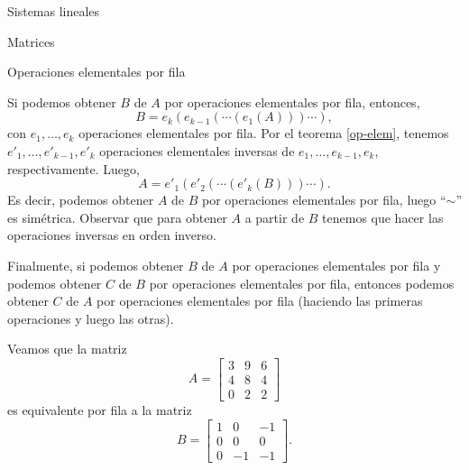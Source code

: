 \begin{chapter}{Sistemas lineales}
\begin{section}{Matrices}
\begin{subsection}{Operaciones elementales por fila}
\begin{observacion*}
                    Si podemos obtener $B$ de $A$ por operaciones elementales por fila, entonces, 
                    $$
                    B = e_k(e_{k-1}(\cdots(e_1(A)))\cdots),
                    $$
                    con $e_1,\ldots,e_k$ operaciones elementales por fila. Por el teorema \ref{op-elem},  tenemos $e'_1,\ldots,e'_{k-1},e'_k$ operaciones elementales inversas de  $e_1,\ldots,e_{k-1},e_k$, respectivamente. Luego, 
                    $$
                    A = e'_1(e'_{2}(\cdots(e'_k(B)))\cdots).
                    $$
                    Es decir, podemos  obtener $A$ de $B$ por operaciones elementales por fila, luego ``$\sim$'' es simétrica. Observar que para obtener $A$ a partir de $B$ tenemos que hacer las operaciones inversas en orden inverso. 
                    
                    Finalmente,   si podemos obtener $B$ de $A$ por operaciones elementales por fila y  podemos obtener $C$ de $B$ por operaciones elementales por fila, entonces podemos obtener $C$ de $A$ por operaciones elementales por fila (haciendo las primeras operaciones y luego las otras).
                \end{observacion*}
                
                \begin{ejemplo*}
                    Veamos que la matriz 
                    \begin{equation*}
                    A= 	\begin{bmatrix}
                    3 & 9 & 6 \\ 4&8&4 \\ 0&2&2
                    \end{bmatrix}
                    \end{equation*}
                    es equivalente por fila a la matriz
                    \begin{equation*}
                    B = \begin{bmatrix}
                    1&0&-1 \\ 0&0&0\\  0&-1&-1
                    \end{bmatrix}.
                    \end{equation*}
                        \end{ejemplo*}
                    

\end{subsection}
\end{section}
\end{chapter}
